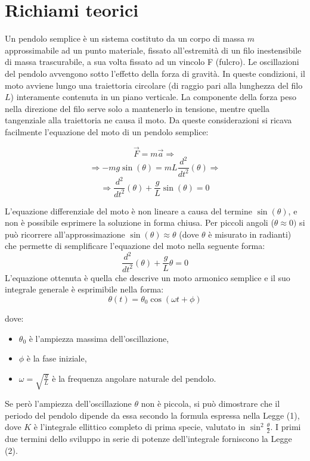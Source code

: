 \documentclass[11pt]{article}
\begin{document}
\clearpage
\section{Richiami teorici}

Un pendolo semplice è un sistema costituto da un corpo di massa $m$ approssimabile ad un punto materiale, fissato all’estremità di un filo inestensibile di massa trascurabile, a sua volta fissato ad un vincolo F (fulcro).  Le oscillazioni del pendolo avvengono sotto l'effetto della forza di gravità.
In queste condizioni, il moto avviene lungo una traiettoria circolare (di raggio pari alla lunghezza del filo $L$) interamente contenuta in un piano verticale. La componente della forza peso nella direzione del filo serve solo a mantenerlo in tensione, mentre quella tangenziale alla traiettoria ne causa il moto. Da queste considerazioni si ricava facilmente l'equazione del moto di un pendolo semplice:

$$\overrightarrow{F}=m\overrightarrow{a}\Rightarrow$$
$$\Rightarrow-mg\sin(\theta)=mL\frac{d^2}{dt^2}(\theta)\Rightarrow$$
\begin{equation}
    \Rightarrow \frac{d^2}{dt^2}(\theta)+\frac{g}{L}\sin(\theta)=0
\end{equation}

L'equazione differenziale del moto è non lineare a causa del termine $\sin (\theta)$, e non è possibile esprimere la soluzione in forma chiusa. Per piccoli angoli ($\theta\approx 0)$ si può ricorrere all'approssimazione $\sin (\theta)\approx\theta$ (dove $\theta$ è misurato in radianti) che permette di semplificare l'equazione del moto nella seguente forma:
\begin{equation}
    \frac{d^2}{dt^2}(\theta)+\frac{g}{L}\theta=0
\end{equation}
L'equazione ottenuta è quella che descrive un moto armonico semplice e il suo integrale generale è esprimibile nella forma:
\begin{equation}
    \theta(t)=\theta_0 \cos(\omega t+\phi)
\end{equation}

dove:
\begin{itemize}
    \item \textbf{$\theta_0$} è l'ampiezza massima dell'oscillazione,
    \item \textbf{$\phi$} è la fase iniziale,
    \item \textbf{$\omega = \sqrt{\frac{g}{L}}$} è la frequenza angolare naturale del pendolo.
\end{itemize}
Se però l'ampiezza dell'oscillazione $\theta$ non è piccola, si può dimostrare che il periodo del pendolo dipende da essa secondo la formula espressa nella Legge (1), dove $K$ è l'integrale ellittico completo di prima specie, valutato in $\sin^2\frac{\theta}{2}$. I primi due termini dello sviluppo in serie di potenze dell'integrale forniscono la Legge (2).
\end{document}
